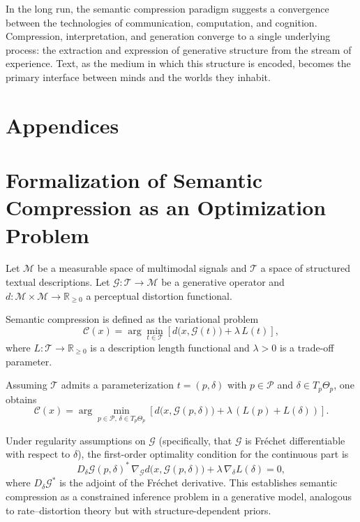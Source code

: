 \documentclass[12pt,a4paper]{article}
\theoremstyle{definition}
\theoremstyle{remark}
\begin{document}
In the long run, the semantic compression paradigm suggests a convergence between the technologies of communication, computation, and cognition. Compression, interpretation, and generation converge to a single underlying process: the extraction and expression of generative structure from the stream of experience. Text, as the medium in which this structure is encoded, becomes the primary interface between minds and the worlds they inhabit.

\newpage
\section*{Appendices}
\appendix

\section{Formalization of Semantic Compression as an Optimization Problem}
\label{app:optimization}

Let $\mathcal{M}$ be a measurable space of multimodal signals and $\mathcal{T}$ a space of structured textual descriptions. Let $\mathcal{G} : \mathcal{T} \to \mathcal{M}$ be a generative operator and $d : \mathcal{M} \times \mathcal{M} \to \mathbb{R}_{\ge 0}$ a perceptual distortion functional.

Semantic compression is defined as the variational problem
\[
\mathcal{C}(x) = \arg\min_{t \in \mathcal{T}} \left[ d\big(x, \mathcal{G}(t)\big) + \lambda \, L(t) \right],
\]
where $L : \mathcal{T} \to \mathbb{R}_{\ge 0}$ is a description length functional and $\lambda > 0$ is a trade-off parameter.

Assuming $\mathcal{T}$ admits a parameterization $t = (p, \delta)$ with $p \in \mathcal{P}$ and $\delta \in T_p\Theta_p$, one obtains
\[
\mathcal{C}(x) = \arg\min_{p \in \mathcal{P}, \, \delta \in T_p\Theta_p} \left[ d\big(x, \mathcal{G}(p,\delta)\big) + \lambda \, (L(p) + L(\delta)) \right].
\]

Under regularity assumptions on $\mathcal{G}$ (specifically, that $\mathcal{G}$ is Fr\'echet differentiable with respect to $\delta$), the first-order optimality condition for the continuous part is
\[
D_\delta \mathcal{G}(p, \delta)^* \, \nabla_{\mathcal{G}} d\big(x, \mathcal{G}(p,\delta)\big) + \lambda \, \nabla_\delta L(\delta) = 0,
\]
where $D_\delta \mathcal{G}^*$ is the adjoint of the Fr\'echet derivative. This establishes semantic compression as a constrained inference problem in a generative model, analogous to rate--distortion theory but with structure-dependent priors.
\end{document}
